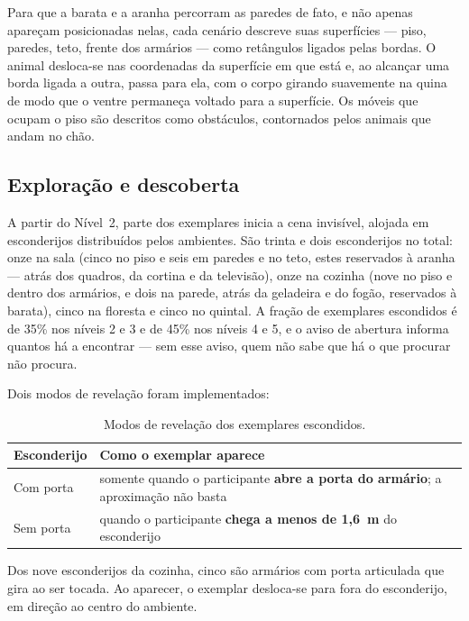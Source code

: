 Para que a barata e a aranha percorram as paredes de fato, e não apenas
apareçam posicionadas nelas, cada cenário descreve suas superfícies ---
piso, paredes, teto, frente dos armários --- como retângulos ligados pelas
bordas. O animal desloca-se nas coordenadas da superfície em que está e,
ao alcançar uma borda ligada a outra, passa para ela, com o corpo girando
suavemente na quina de modo que o ventre permaneça voltado para a
superfície. Os móveis que ocupam o piso são descritos como obstáculos,
contornados pelos animais que andam no chão.

\subsection{Exploração e descoberta}

A partir do Nível~2, parte dos exemplares inicia a cena invisível,
alojada em esconderijos distribuídos pelos ambientes. São trinta e dois
esconderijos no total: onze na sala (cinco no piso e seis em paredes e no
teto, estes reservados à aranha --- atrás dos quadros, da cortina e da
televisão), onze na cozinha (nove no piso e dentro dos armários, e dois
na parede, atrás da geladeira e do fogão, reservados à barata), cinco na
floresta e cinco no quintal. A fração de exemplares escondidos é de 35\%
nos níveis 2 e 3 e de 45\% nos níveis 4 e 5, e o aviso de abertura
informa quantos há a encontrar --- sem esse aviso, quem não sabe que há o
que procurar não procura.

Dois modos de revelação foram implementados:

\begin{table}[htbp]
\centering
\caption{Modos de revelação dos exemplares escondidos.}
\label{tab:revelacao}
\begin{tabular}{p{2.6cm}p{10.0cm}}
\toprule
\textbf{Esconderijo} & \textbf{Como o exemplar aparece} \\
\midrule
Com porta & somente quando o participante \textbf{abre a porta do armário}; a aproximação não basta \\
Sem porta & quando o participante \textbf{chega a menos de 1,6~m} do esconderijo \\
\bottomrule
\end{tabular}
\end{table}

Dos nove esconderijos da cozinha, cinco são armários com porta articulada
que gira ao ser tocada. Ao aparecer, o exemplar desloca-se para fora do
esconderijo, em direção ao centro do ambiente.

